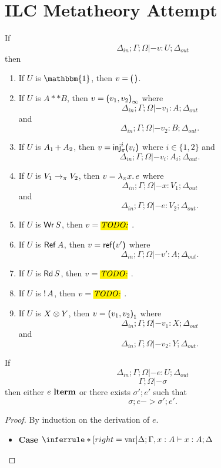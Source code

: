 \section{ILC Metatheory Attempt}

\begin{lemma}
  If \[\Delta_{in} ; \Gamma ; \Omega |- v : U ; \Delta_{out}\] then
  \begin{enumerate}
  \item If $U$ is $\mathbbm{1}$, then $v = \eUnit$.
  \item If $U$ is $A ** B$, then $v = \textsf{(}{v_1},{v_2}\textsf{)}_{\infty}$ where \[\Delta_{in} ; \Gamma ; \Omega |-
    v_1 : A ; \Delta_{out}\] and \[\Delta_{in} ; \Gamma ; \Omega |- v_2 : B ; \Delta_{out}.\]
  \item If $U$ is ${A_1}\, {+}_{}\, {A_2}$, then $v = \text{\textsf{inj}}_{\pi}^{i}\textsf{(} v_i\textsf{)}$
    where $i \in \{1, 2\}$ and \[\Delta_{in} ; \Gamma ; \Omega |- v_i : A_i ; \Delta_{out}.\]
  \item If $U$ is ${V_1}\rightarrow_{\pi}{V_2}$, then $v = \lambda_{\pi} {x}.\,{e}$
    where \[\Delta_{in} ; \Gamma ; \Omega |- x : V_1 ; \Delta_{out}\] and \[\Delta_{in} ; \Gamma ; \Omega |- e :
    V_2 ; \Delta_{out}.\]
  \item If $U$ is $\text{\textsf{Wr}}\,S$, then $v = \todo{}$.
  \item If $U$ is $\text{\textsf{Ref}}\,A$, then $v = \text{\textsf{ref}}\textsf{(}{v'}\textsf{)}$ where \[\Delta_{in} ; \Gamma ; \Omega |- v'
    : A ; \Delta_{out}.\]    
  \item If $U$ is $\text{\textsf{Rd}}\,S$, then $v = \todo{}$.
  \item If $U$ is ${!}\,{A}$, then $v = \todo{}$.
  \item If $U$ is ${X}\otimes{Y}$, then $v = \textsf{(}{v_1},{v_2}\textsf{)}_{1}$
    where \[\Delta_{in} ; \Gamma ; \Omega |- v_1 : X ; \Delta_{out}\] and \[\Delta_{in} ; \Gamma ; \Omega |- v_2 : Y
    ; \Delta_{out}.\]    
  \end{enumerate}
\end{lemma}

\begin{theorem}
  If \[\Delta_{in} ; \Gamma ; \Omega |- e : U ; \Delta_{out}\] \[\Gamma ; \Omega |- \sigma\]
  then either $e~\textbf{lterm}$ or there exists $\sigma' ; e'$ such that \[\sigma ; e -> \sigma' ; e'.\]
\end{theorem}

\begin{proof}
  By induction on the derivation of $e$.
  \begin{itemize}
  \item \textbf{Case}
      $\Infer{var}
      {}
      {\Delta; \Gamma, x : A |- x : A ; \Delta}$
  \end{itemize}
\end{proof}

